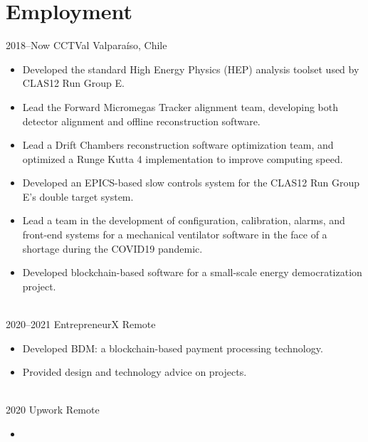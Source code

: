 \documentclass[a4paper]{cv-style}
\begin{document}
\section{Employment}
    \begin{entrylist}
        \entry
            {2018--Now}
            {CCTVal}
            {Valpara\'iso, Chile}
            {
            \begin{itemize}
                \item
                    Developed the standard High Energy Physics (HEP) analysis toolset used by CLAS12 Run Group E.
                \item
                    Lead the Forward Micromegas Tracker alignment team, developing both detector alignment and offline reconstruction software.
                \item
                    Lead a Drift Chambers reconstruction software optimization team, and optimized a Runge Kutta 4 implementation to improve computing speed.
                \item
                    Developed an EPICS-based slow controls system for the CLAS12 Run Group E's double target system.
                \item
                    Lead a team in the development of configuration, calibration, alarms, and front-end systems for a mechanical ventilator software in the face of a shortage during the COVID19 pandemic.
                \item
                    Developed blockchain-based software for a small-scale energy democratization project.
            \end{itemize}} \\
        \entry
            {2020--2021}
            {EntrepreneurX}
            {Remote}
            {
            \begin{itemize}
                \item
                    Developed BDM: a blockchain-based payment processing technology.
                \item
                    Provided design and technology advice on projects.
            \end{itemize}} \\
        \entry
            {2020}
            {Upwork}
            {Remote}
            {
            \begin{itemize}
                \item

\end{itemize}}
\end{entrylist}
\end{document}
